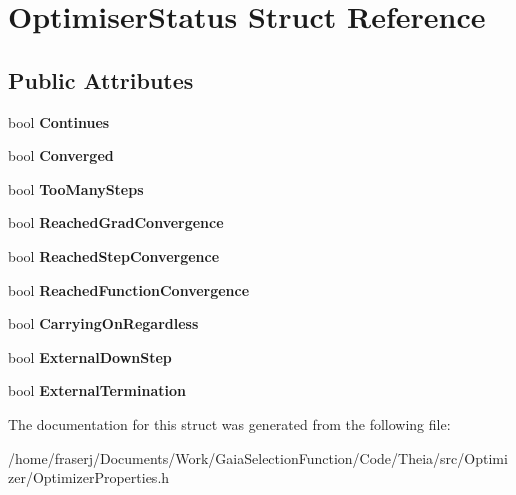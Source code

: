 \hypertarget{structOptimiserStatus}{}\section{Optimiser\+Status Struct Reference}
\label{structOptimiserStatus}
\subsection*{Public Attributes}
\begin{DoxyCompactItemize}
\item 
\mbox{\label{structOptimiserStatus_a7d45c2a7646e88ac74e2f81131f82dd2}} 
bool {\bfseries Continues}
\item 
\mbox{\label{structOptimiserStatus_a70321c01ac661dabf5b180031e9b8bb2}} 
bool {\bfseries Converged}
\item 
\mbox{\label{structOptimiserStatus_a9fa1878474d02076b4ec867808abaa3e}} 
bool {\bfseries Too\+Many\+Steps}
\item 
\mbox{\label{structOptimiserStatus_a58d7f4f4f10a4b1059b8290b6486e0d5}} 
bool {\bfseries Reached\+Grad\+Convergence}
\item 
\mbox{\label{structOptimiserStatus_a854bfaef4df67e031069a00b6325ca86}} 
bool {\bfseries Reached\+Step\+Convergence}
\item 
\mbox{\label{structOptimiserStatus_a2c0efe44cd78260c25e9e4551cfb9fa6}} 
bool {\bfseries Reached\+Function\+Convergence}
\item 
\mbox{\label{structOptimiserStatus_ab4b142d6d72ddfd87174278faa7901ae}} 
bool {\bfseries Carrying\+On\+Regardless}
\item 
\mbox{\label{structOptimiserStatus_af46b372523642690c97fe310dd04efdb}} 
bool {\bfseries External\+Down\+Step}
\item 
\mbox{\label{structOptimiserStatus_a29dda78a363c436d68fbd5eb342cd862}} 
bool {\bfseries External\+Termination}
\end{DoxyCompactItemize}


The documentation for this struct was generated from the following file\+:\begin{DoxyCompactItemize}
\item 
/home/fraserj/\+Documents/\+Work/\+Gaia\+Selection\+Function/\+Code/\+Theia/src/\+Optimizer/Optimizer\+Properties.\+h\end{DoxyCompactItemize}
